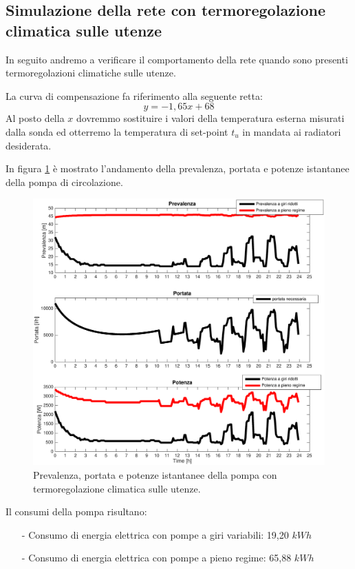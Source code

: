 \documentclass[laurea,oneside,11pt]{USiena_tesiLM}
\begin{document}
\subsection{Simulazione della rete con termoregolazione climatica sulle utenze}
In seguito andremo a verificare il comportamento della rete quando sono presenti termoregolazioni climatiche sulle utenze. 

La curva di compensazione fa riferimento alla seguente retta:
\begin{equation}
y = -1,65 x + 68
\end{equation}
Al posto della $x$ dovremmo sostituire i valori della temperatura esterna misurati dalla sonda ed otterremo la temperatura di set-point $t_u$ in mandata ai radiatori  desiderata.

In figura \ref{fig:sim_climatica} è mostrato l'andamento della prevalenza, portata e potenze istantanee della pompa di circolazione.

\begin{figure}[!ht]
\centering
\includegraphics[width=\textwidth]{figure/sim_climatica} 
\caption{Prevalenza, portata e potenze istantanee della pompa con termoregolazione climatica sulle utenze.}
\label{fig:sim_climatica}
\end{figure}

Il consumi della pompa risultano:
\begin{itemize}
\item[-] Consumo di energia elettrica con pompe a giri variabili: 19,20 $kWh$ 
\item[-] Consumo di energia elettrica con pompe a pieno regime: 65,88 $kWh$
\end{itemize}
\end{document}
